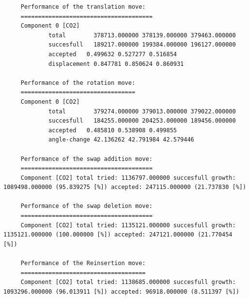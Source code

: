 \begin{tiny}
\begin{verbatim}
     Performance of the translation move:
     ======================================
     Component 0 [CO2]
             total        378713.000000 378139.000000 379463.000000
             succesfull   189217.000000 199384.000000 196127.000000
             accepted   0.499632 0.527277 0.516854
             displacement 0.847781 0.850624 0.860931
     
     Performance of the rotation move:
     =================================
     Component 0 [CO2]
             total        379274.000000 379013.000000 379022.000000
             succesfull   184255.000000 204253.000000 189456.000000
             accepted   0.485810 0.538908 0.499855
             angle-change 42.136262 42.791984 42.579446
     
     Performance of the swap addition move:
     ======================================
     Component [CO2] total tried: 1136797.000000 succesfull growth: 1089498.000000 (95.839275 [%]) accepted: 247115.000000 (21.737830 [%])
     
     Performance of the swap deletion move:
     ======================================
     Component [CO2] total tried: 1135121.000000 succesfull growth: 1135121.000000 (100.000000 [%]) accepted: 247121.000000 (21.770454 [%])
     
     Performance of the Reinsertion move:
     ====================================
     Component [CO2] total tried: 1138685.000000 succesfull growth: 1093296.000000 (96.013911 [%]) accepted: 96918.000000 (8.511397 [%])
\end{verbatim}
\end{tiny}

